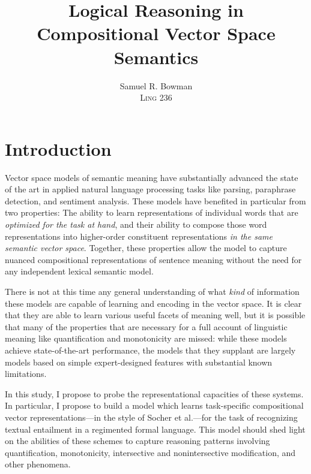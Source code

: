 \documentclass[12pt,leqno,tbtags,twoside]{article}
\title{\Large Logical Reasoning in Compositional Vector Space Semantics}
\author{Samuel R. Bowman\\\textsc{Ling 236}}
\theoremstyle{dotless}
\begin{document}
\maketitle


\def\Y{\textbabygamma}
\def\P{\textceltpal}
\def\Rs{\textsubwedge} %
\def\E{\tipaloweraccent[.1ex]{8}{e}} %
\def\A{\sublptr{\"{a}}}

\maketitle



\section{Introduction}

Vector space models of semantic meaning have  substantially advanced the state of the art in applied natural language processing tasks like parsing, paraphrase detection, and sentiment analysis. These models have benefited in particular from two properties: The ability to learn representations of individual words that are \textit{optimized for the task at hand}, and their ability to compose those word representations into higher-order constituent representations \textit{in the same semantic vector space}. Together, these properties allow the model to capture nuanced compositional representations of sentence meaning without the need for any independent lexical semantic model.

There is not at this time any general understanding of what \textit{kind} of information these models are capable of learning and encoding in the vector space. It is clear that they are able to learn various useful facets of meaning well, but it is possible that many of the properties that are necessary for a full account of linguistic meaning like quantification and monotonicity are missed: while these models achieve state-of-the-art performance, the models that they supplant are largely models based on simple expert-designed features with substantial known limitations.

In this study, I propose to probe the representational capacities of these systems. In particular, I propose to build a model which learns task-specific compositional vector representations---in the style of Socher et al.---for the task of recognizing textual entailment in a regimented formal language. This model should shed light on the abilities of these schemes to capture reasoning patterns involving quantification, monotonicity, intersective and nonintersective modification, and other phenomena.
\end{document}
